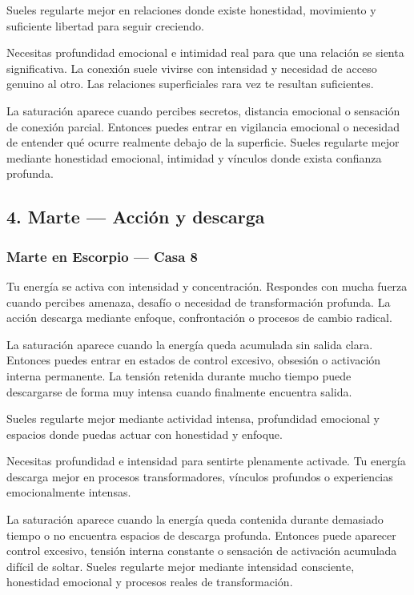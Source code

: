 \documentclass[11pt,a4paper]{article}
\begin{document}
Sueles regularte mejor en relaciones donde existe honestidad, movimiento y suficiente libertad para seguir creciendo.

Necesitas profundidad emocional e intimidad real para que una relación se sienta significativa. La conexión suele vivirse con intensidad y necesidad de acceso genuino al otro. Las relaciones superficiales rara vez te resultan suficientes.

La saturación aparece cuando percibes secretos, distancia emocional o sensación de conexión parcial. Entonces puedes entrar en vigilancia emocional o necesidad de entender qué ocurre realmente debajo de la superficie. Sueles regularte mejor mediante honestidad emocional, intimidad y vínculos donde exista confianza profunda.

\vspace{0.8cm}

\subsection{4. Marte — Acción y descarga}

\subsubsection*{Marte en Escorpio — Casa 8}

\justifying
Tu energía se activa con intensidad y concentración. Respondes con mucha fuerza cuando percibes amenaza, desafío o necesidad de transformación profunda. La acción descarga mediante enfoque, confrontación o procesos de cambio radical.

La saturación aparece cuando la energía queda acumulada sin salida clara. Entonces puedes entrar en estados de control excesivo, obsesión o activación interna permanente. La tensión retenida durante mucho tiempo puede descargarse de forma muy intensa cuando finalmente encuentra salida.

Sueles regularte mejor mediante actividad intensa, profundidad emocional y espacios donde puedas actuar con honestidad y enfoque.

Necesitas profundidad e intensidad para sentirte plenamente activade. Tu energía descarga mejor en procesos transformadores, vínculos profundos o experiencias emocionalmente intensas.

La saturación aparece cuando la energía queda contenida durante demasiado tiempo o no encuentra espacios de descarga profunda. Entonces puede aparecer control excesivo, tensión interna constante o sensación de activación acumulada difícil de soltar. Sueles regularte mejor mediante intensidad consciente, honestidad emocional y procesos reales de transformación.
\end{document}
